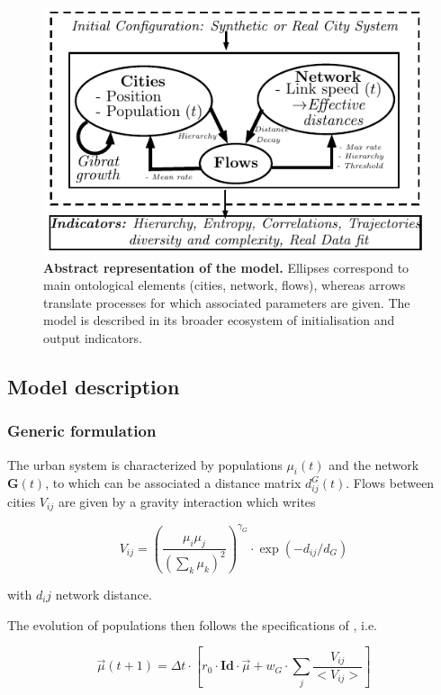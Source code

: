 \documentclass[11pt]{article}
\begin{document}
\begin{figure}
\includegraphics[width=\linewidth]{model.pdf}
\caption{\textbf{Abstract representation of the model.} Ellipses correspond to main ontological elements (cities, network, flows), whereas arrows translate processes for which associated parameters are given. The model is described in its broader ecosystem of initialisation and output indicators.\label{fig:macrocoevol:model}}
\end{figure}


\subsection{Model description}


\subsubsection{Generic formulation}

The urban system is characterized by populations $\mu_i(t)$ and the network $\mathbf{G}(t)$, to which can be associated a distance matrix $d^G_{ij}(t)$. Flows between cities $V_{ij}$ are given by a gravity interaction which writes

\begin{equation}
V_{ij} = \left(\frac{\mu_i\mu_j}{\left(\sum_k{\mu_k}\right)^2}\right)^{\gamma_G}\cdot \exp{\left(-d_{ij}/d_G\right)}
\end{equation}

with $d_ij$ network distance.

The evolution of populations then follows the specifications of \cite{raimbault2018indirect}, i.e.

\begin{equation}
\vec{\mu}(t+1)=\Delta t\cdot \left[ r_0\cdot \mathbf{Id}\cdot \vec{\mu} + w_G\cdot \sum_j \frac{V_{ij}}{<V_{ij}>}\right]
\end{equation}
\end{document}

